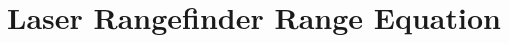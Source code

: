 \documentclass{article}
\begin{document}
\section{Laser Rangefinder Range Equation}



\FloatBarrier
\printbibliography
\end{document}
